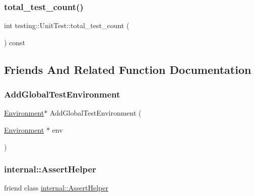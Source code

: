 \subsubsection{\texorpdfstring{total\_test\_count()}{total\_test\_count()}}
{\footnotesize\ttfamily int testing\+::\+Unit\+Test\+::total\+\_\+test\+\_\+count (\begin{DoxyParamCaption}{ }\end{DoxyParamCaption}) const}



\subsection{Friends And Related Function Documentation}
\mbox{\label{classtesting_1_1_unit_test_a5ec26e4c31220ff8e769cc09689a4d6d}} 
\subsubsection{\texorpdfstring{AddGlobalTestEnvironment}{AddGlobalTestEnvironment}}
{\footnotesize\ttfamily \mbox{\hyperlink{classtesting_1_1_environment}{Environment}}$\ast$ Add\+Global\+Test\+Environment (\begin{DoxyParamCaption}\item[{\mbox{\hyperlink{classtesting_1_1_environment}{Environment}} $\ast$}]{env }\end{DoxyParamCaption})\hspace{0.3cm}{\ttfamily [friend]}}

\mbox{\label{classtesting_1_1_unit_test_a183151aa061362c87572e743fe233db1}} 
\subsubsection{\texorpdfstring{internal::AssertHelper}{internal::AssertHelper}}
{\footnotesize\ttfamily friend class \mbox{\hyperlink{classtesting_1_1internal_1_1_assert_helper}{internal\+::\+Assert\+Helper}}\hspace{0.3cm}{\ttfamily [friend]}}

